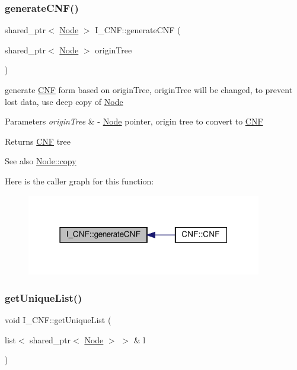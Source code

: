 \subsubsection{\texorpdfstring{generate\+C\+N\+F()}{generateCNF()}}
{\footnotesize\ttfamily shared\+\_\+ptr$<$ \hyperlink{class_node}{Node} $>$ I\+\_\+\+C\+N\+F\+::generate\+C\+NF (\begin{DoxyParamCaption}\item[{shared\+\_\+ptr$<$ \hyperlink{class_node}{Node} $>$}]{origin\+Tree }\end{DoxyParamCaption})}



generate \hyperlink{class_c_n_f}{C\+NF} form based on origin\+Tree, origin\+Tree will be changed, to prevent lost data, use deep copy of \hyperlink{class_node}{Node} 


\begin{DoxyParams}{Parameters}
{\em origin\+Tree} & -\/ \hyperlink{class_node}{Node} pointer, origin tree to convert to \hyperlink{class_c_n_f}{C\+NF} \\
\hline
\end{DoxyParams}
\begin{DoxyReturn}{Returns}
\hyperlink{class_c_n_f}{C\+NF} tree 
\end{DoxyReturn}
\begin{DoxySeeAlso}{See also}
\hyperlink{class_node_a0d22a418a622a24852610fd51910c5eb}{Node\+::copy} 
\end{DoxySeeAlso}
Here is the caller graph for this function\+:\nopagebreak
\begin{figure}[H]
\begin{center}
\leavevmode
\includegraphics[width=291pt]{d5/d80/struct_i___c_n_f_afedf64bb258fd48ea0f811a9f571f0f0_icgraph}
\end{center}
\end{figure}
\mbox{\label{struct_i___c_n_f_ad417af0f07b5e7035c3671dcc3e9f798}} 
\subsubsection{\texorpdfstring{get\+Unique\+List()}{getUniqueList()}}
{\footnotesize\ttfamily void I\+\_\+\+C\+N\+F\+::get\+Unique\+List (\begin{DoxyParamCaption}\item[{list$<$ shared\+\_\+ptr$<$ \hyperlink{class_node}{Node} $>$ $>$ \&}]{l }\end{DoxyParamCaption})\hspace{0.3cm}{\ttfamily [protected]}}



